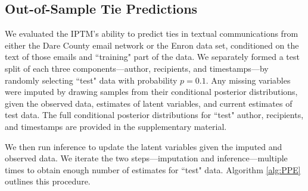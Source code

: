 \documentclass{article}
\begin{document}
 	   \subsection{Out-of-Sample Tie Predictions}\label{subsec:Tie Prediction}
 	   We evaluated the IPTM's ability to predict ties in textual communications from either the Dare County email network or the Enron data set, conditioned on the text of those emails and ``training" part of the data. We separately formed a test split of each three components---author, recipients, and timestamps---by randomly selecting ``test" data with probability $p=0.1$. Any missing variables were imputed by drawing samples from their conditional posterior distributions, given the observed data, estimates of latent variables, and current estimates of test data. The full conditional posterior distributions for ``test" author, recipients, and timestamps are provided in the supplementary material.
 	   
 	   We then run inference to update the latent variables given the imputed and observed data. We iterate the two steps---imputation and inference---multiple times to obtain enough number of estimates for ``test" data. Algorithm \ref{alg:PPE} outlines this procedure.
 	   
\end{document}
